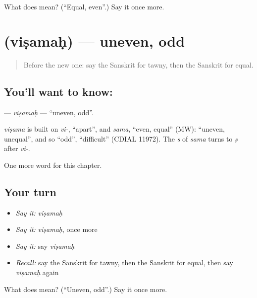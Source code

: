 \begin{tcolorbox}[breakable,colback=teal!4,colframe=teal!35!black,title={Before you move on}]
What does  mean? (\textquotedblleft{}Equal, even\textquotedblright{}.) Say it once more.
\end{tcolorbox}
\section[\texorpdfstring{\sk{विषमः} (viṣamaḥ)}{विषमः (viṣamaḥ)}]{ (viṣamaḥ) — uneven, odd}

\label{lesson:SA-C217-visamah}



\begin{quote}
Before the new one: say the Sanskrit for tawny, then the Sanskrit for equal.
\end{quote}

\subsection*{You'll want to know: }
\textbf{} — \emph{viṣamaḥ} — \textquotedblleft{}uneven, odd\textquotedblright{}.

\begin{cousinweb}
\emph{viṣama} is built on \emph{vi-}, \textquotedblleft{}apart\textquotedblright{}, and \emph{sama}, \textquotedblleft{}even, equal\textquotedblright{} (MW): \textquotedblleft{}uneven, unequal\textquotedblright{}, and so \textquotedblleft{}odd\textquotedblright{}, \textquotedblleft{}difficult\textquotedblright{} (CDIAL 11972). The \emph{s} of \emph{sama} turns to \emph{ṣ} after \emph{vi-}.
\end{cousinweb}

\begin{grammarlens}[title={What you've built}]
One more word for this chapter.
\end{grammarlens}

\subsection*{Your turn}
\begin{itemize}
\raggedright
  \item \emph{Say it:} \emph{viṣamaḥ}
  \item \emph{Say it:} \emph{viṣamaḥ}, once more
  \item \emph{Say it:} say \emph{viṣamaḥ}
  \item \emph{Recall:} say the Sanskrit for tawny, then the Sanskrit for equal, then say \emph{viṣamaḥ} again
\end{itemize}

\begin{tcolorbox}[breakable,colback=teal!4,colframe=teal!35!black,title={Before you move on}]
What does  mean? (\textquotedblleft{}Uneven, odd\textquotedblright{}.) Say it once more.
\end{tcolorbox}
